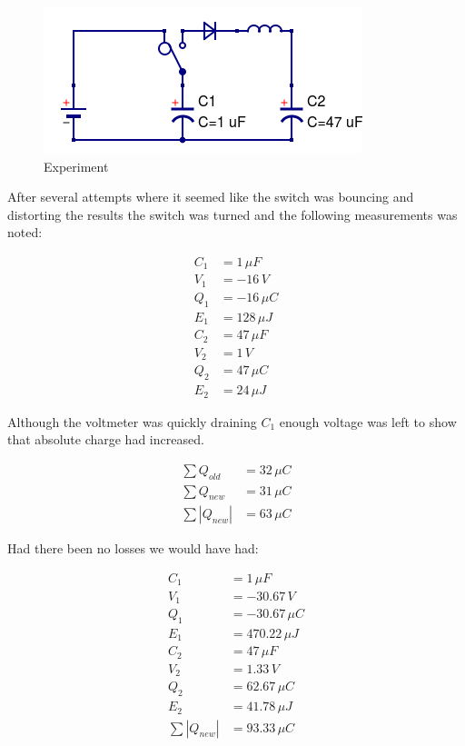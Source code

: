 \documentclass[]{elementary-physics}
\begin{document}
\begin{figure}[ht] \centering
	\includegraphics[scale=.5]{BLCC} \caption{Experiment}
\end{figure}

After several attempts where it seemed like the switch was bouncing and distorting the results the switch was turned and the following measurements was noted:

\begin{subequations}
\begin{align}
C_1 &= 1 \, \mu F \\
V_1 &= -16 \, V \\
Q_1 &= -16 \, \mu C \\
E_1 &= 128 \, \mu J \\
C_2 &= 47 \, \mu F \\
V_2 &= 1 \, V \\
Q_2 &= 47 \, \mu C \\
E_2 &= 24 \, \mu J
\end{align}
\end{subequations}

Although the voltmeter was quickly draining $C_1$ enough voltage was left to show that absolute charge had increased.

\begin{subequations}
\begin{align}
\sum Q_{old} &= 32 \, \mu C \\
\sum Q_{new} &= 31 \, \mu C \\
\sum |Q_{new}| &= 63 \, \mu C
\end{align}
\end{subequations}

Had there been no losses we would have had:

\begin{subequations}
\begin{align}
C_1 &= 1 \, \mu F \\
V_1 &= -30.67 \, V \\
Q_1 &= -30.67 \, \mu C \\
E_1 &= 470.22 \, \mu J \\
C_2 &= 47 \, \mu F \\
V_2 &= 1.33 \, V \\
Q_2 &= 62.67 \, \mu C \\
E_2 &= 41.78 \, \mu J \\
\sum |Q_{new}| &= 93.33 \, \mu C
\end{align}
\end{subequations}
\end{document}
